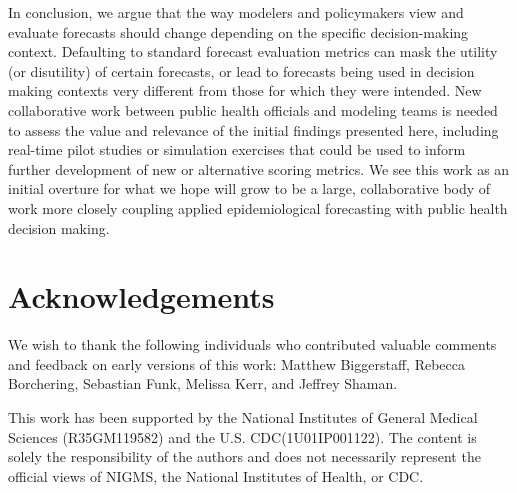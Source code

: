 \documentclass{article}\usepackage[]{graphicx}\usepackage[]{xcolor}
\begin{document}
In conclusion, we argue that the way modelers and policymakers view and evaluate forecasts should change depending on the specific decision-making context.
Defaulting to standard forecast evaluation metrics can mask the utility (or disutility) of certain forecasts, or lead to forecasts being used in decision making contexts very different from those for which they were intended.
New collaborative work between public health officials and modeling teams is needed to assess the value and relevance of the initial findings presented here, including real-time pilot studies or simulation exercises that could be used to inform further development of new or alternative scoring metrics.
We see this work as an initial overture for what we hope will grow to be a large, collaborative body of work more closely coupling applied epidemiological forecasting with public health decision making.

\section*{Acknowledgements}

We wish to thank the following individuals who contributed valuable comments and feedback on early versions of this work: Matthew Biggerstaff, Rebecca Borchering, Sebastian Funk, Melissa Kerr, and Jeffrey Shaman.

This work has been supported by the National Institutes of General Medical Sciences (R35GM119582) and the U.S. CDC(1U01IP001122). The content is solely the responsibility of the authors and does not necessarily represent the official views of NIGMS, the National Institutes of Health, or CDC.


\end{document}
